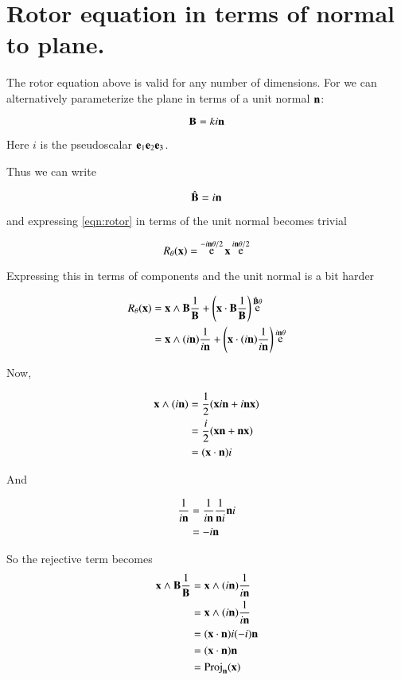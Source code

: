 \documentclass{article}      %
\DeclareMathOperator{\Exp}{e}
\begin{document}
\section{ Rotor equation in terms of normal to plane. }

The rotor equation above is valid for any number of dimensions.  For  we can alternatively parameterize the plane in terms of
a unit normal $\mathbf{n}$:

\[
\mathbf{B} = k i\mathbf{n}
\]

Here $i$ is the  pseudoscalar $\mathbf{e}_1 \mathbf{e}_2 \mathbf{e}_3$.

Thus we can write

\[
\hat{\mathbf{B}} = i\mathbf{n}
\]

and expressing \ref{eqn:rotor} in terms of the unit normal becomes trivial

\begin{equation}
R_\theta(\Bx) 
= \Exp^{- i {\Bn}\theta/2} \Bx \Exp^{i{\Bn}\theta/2}
\end{equation}

Expressing this in terms of components and the unit normal is a bit harder

\begin{align*}
R_\theta(\Bx) 
&= \Bx \wedge \BB \inv{\BB} + \left(\Bx \cdot \BB \inv{\BB}\right)\Exp^{\hat{\BB}\theta} \\
&= \Bx \wedge (i\Bn) \inv{i\Bn} + \left(\Bx \cdot (i\Bn) \inv{i\Bn}\right)\Exp^{{i\Bn}\theta} \\
\end{align*}

Now, 

\begin{align*}
\mathbf{x} \wedge (i\mathbf{n}) 
&= \frac{1}{2}(\mathbf{x} i \mathbf{n} + i \mathbf{n} \mathbf{x}) \\
&= \frac{i}{2}(\mathbf{x} \mathbf{n} + \mathbf{n} \mathbf{x}) \\
&= (\mathbf{x} \cdot \mathbf{n}) i
\end{align*}

And

\begin{align*}
\frac{1}{i\mathbf{n}} 
&= \frac{1}{i\mathbf{n}} \frac{1}{\mathbf{n} i} \mathbf{n} i \\
&= - i \mathbf{n} \\
\end{align*}

So the rejective term becomes
\begin{align*}
\mathbf{x} \wedge \mathbf{B} \frac{1}{\mathbf{B}} 
&= \mathbf{x} \wedge (i\mathbf{n}) \frac{1}{i\mathbf{n}} \\
&= \mathbf{x} \wedge (i\mathbf{n}) \frac{1}{i\mathbf{n}} \\
&= (\mathbf{x} \cdot \mathbf{n}) i (-i) \mathbf{n} \\
&= (\mathbf{x} \cdot \mathbf{n}) \mathbf{n} \\
&= \operatorname{Proj}_{\mathbf{n}}(\mathbf{x}) \\
\end{align*}
\end{document}
